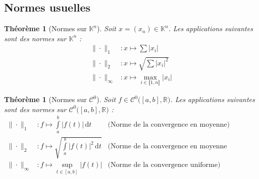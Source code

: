 \documentclass[11pt,a4paper]{report}
\newtheorem{itheorem}[theorem]{Théorème}
\theoremstyle{definition}
\begin{document}
\subsection{Normes usuelles} %
\label{sub:normes_usuelles}
\begin{itheorem}[Normes sur $\mathbb{K}^n$]
     Soit $x=(x_n)\in \mathbb{K}^n$. Les applications suivantes sont des normes sur $\mathbb{K}^n$ : 
     \begin{subequations}
          \begin{align}
               \| \cdot \|_1 &: x \longmapsto \sum | x_i | \\
               \| \cdot \|_2 &: x \longmapsto \sqrt{\sum |x_i |^2} \\
               \| \cdot \|_\infty &: x \longmapsto \max_{i\in \llbracket 1, n \rrbracket } | x_i |
          \end{align}
     \end{subequations}
\end{itheorem}
\begin{itheorem}[Normes sur $\mathscr{C}^0$]
     Soit $f \in \mathscr{C}^0\Big( [a,b], \ensuremath{\mathbb{R}}\Big)$. Les applications suivantes sont des normes sur $\mathscr{C}^0\Big( [a,b], \ensuremath{\mathbb{R}}\Big)$ : 
     \begin{subequations}
          \begin{align}
               \| \cdot \|_1 &: f \longmapsto \int\limits_a^b |f(t)| \,\mathrm{d} t 
                            &\text{(Norme de la convergence en moyenne)} \\
               \| \cdot \|_2 &: f \longmapsto \sqrt{\int\limits_a^b |f(t)|^2 \,\mathrm{d} t}
                            &\text{(Norme de la convergence en moyenne quadratique)} \\
               \| \cdot \|_\infty &: f \longmapsto \sup_{t\in [a,b]} |f(t)| 
                            &\text{(Norme de la convergence uniforme)}
          \end{align}
     \end{subequations}
\end{itheorem}

\end{document}
